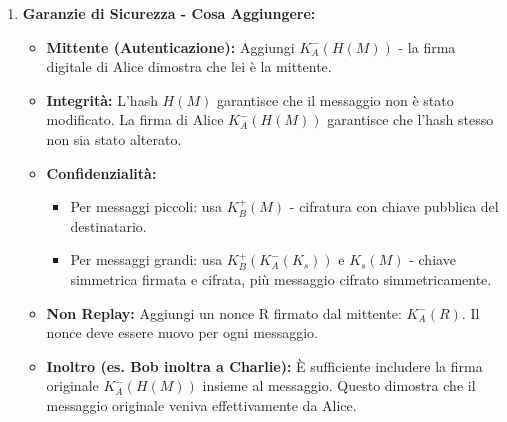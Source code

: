 \begin{enumerate}[label=\arabic*.]
    \item \textbf{Garanzie di Sicurezza - Cosa Aggiungere:}
    \begin{itemize}
        \item \textbf{Mittente (Autenticazione):} Aggiungi $K_A^-(H(M))$ - la firma digitale di Alice dimostra che lei è la mittente.
        \item \textbf{Integrità:} L'hash $H(M)$ garantisce che il messaggio non è stato modificato. La firma di Alice $K_A^-(H(M))$ garantisce che l'hash stesso non sia stato alterato.
        \item \textbf{Confidenzialità:} 
        \begin{itemize}
            \item Per messaggi piccoli: usa $K_B^+(M)$ - cifratura con chiave pubblica del destinatario.
            \item Per messaggi grandi: usa $K_B^+(K_A^-(K_s))$ e $K_s(M)$ - chiave simmetrica firmata e cifrata, più messaggio cifrato simmetricamente.
        \end{itemize}
        \item \textbf{Non Replay:} Aggiungi un nonce R firmato dal mittente: $K_A^-(R)$. Il nonce deve essere nuovo per ogni messaggio.
        \item \textbf{Inoltro (es. Bob inoltra a Charlie):} È sufficiente includere la firma originale $K_A^-(H(M))$ insieme al messaggio. Questo dimostra che il messaggio originale veniva effettivamente da Alice.
    \end{itemize}


\end{enumerate}
